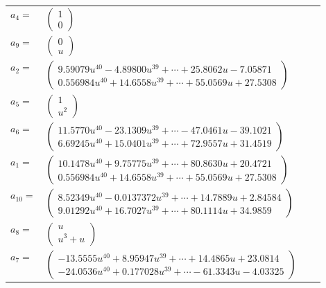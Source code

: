 \documentclass[1p]{elsarticle_modified}
\theoremstyle{definition}
\begin{document}
\begin{tabular}{m{7pt} m{180pt} m{7pt} m{180pt} }
\flushright $a_{4}=$&$\begin{pmatrix}1\\0\end{pmatrix}$ \\
\flushright $a_{9}=$&$\begin{pmatrix}0\\u\end{pmatrix}$ \\
\flushright $a_{2}=$&$\begin{pmatrix}9.59079 u^{40}-4.89800 u^{39}+\cdots+25.8062 u-7.05871\\0.556984 u^{40}+14.6558 u^{39}+\cdots+55.0569 u+27.5308\end{pmatrix}$ \\
\flushright $a_{5}=$&$\begin{pmatrix}1\\u^2\end{pmatrix}$ \\
\flushright $a_{6}=$&$\begin{pmatrix}11.5770 u^{40}-23.1309 u^{39}+\cdots-47.0461 u-39.1021\\6.69245 u^{40}+15.0401 u^{39}+\cdots+72.9557 u+31.4519\end{pmatrix}$ \\
\flushright $a_{1}=$&$\begin{pmatrix}10.1478 u^{40}+9.75775 u^{39}+\cdots+80.8630 u+20.4721\\0.556984 u^{40}+14.6558 u^{39}+\cdots+55.0569 u+27.5308\end{pmatrix}$ \\
\flushright $a_{10}=$&$\begin{pmatrix}8.52349 u^{40}-0.0137372 u^{39}+\cdots+14.7889 u+2.84584\\9.01292 u^{40}+16.7027 u^{39}+\cdots+80.1114 u+34.9859\end{pmatrix}$ \\
\flushright $a_{8}=$&$\begin{pmatrix}u\\u^3+u\end{pmatrix}$ \\
\flushright $a_{7}=$&$\begin{pmatrix}-13.5555 u^{40}+8.95947 u^{39}+\cdots+14.4865 u+23.0814\\-24.0536 u^{40}+0.177028 u^{39}+\cdots-61.3343 u-4.03325\end{pmatrix}$ \\

\end{tabular}
\end{document}
